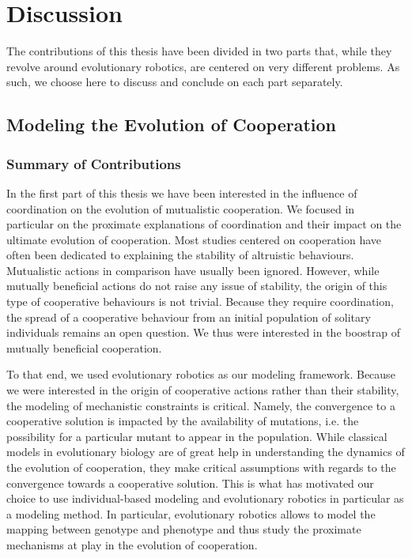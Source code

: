 \chapter{Discussion}


\minitoc[n] %

The contributions of this thesis have been divided in two parts that, while they revolve around evolutionary robotics, are centered on very different problems. As such, we choose here to discuss and conclude on each part separately.

\section{Modeling the Evolution of Cooperation}

	\subsection{Summary of Contributions}

		In the first part of this thesis we have been interested in the influence of coordination on the evolution of mutualistic cooperation. We focused in particular on the proximate explanations of coordination and their impact on the ultimate evolution of cooperation. Most studies centered on cooperation have often been dedicated to explaining the stability of altruistic behaviours. Mutualistic actions in comparison have usually been ignored. However, while mutually beneficial actions do not raise any issue of stability, the origin of this type of cooperative behaviours is not trivial. Because they require coordination, the spread of a cooperative behaviour from an initial population of solitary individuals remains an open question. We thus were interested in the boostrap of mutually beneficial cooperation.

		To that end, we used evolutionary robotics as our modeling framework. Because we were interested in the origin of cooperative actions rather than their stability, the modeling of mechanistic constraints is critical. Namely, the convergence to a cooperative solution is impacted by the availability of mutations, i.e. the possibility for a particular mutant to appear in the population. While classical models in evolutionary biology are of great help in understanding the dynamics of the evolution of cooperation, they make critical assumptions with regards to the convergence towards a cooperative solution. This is what has motivated our choice to use individual-based modeling and evolutionary robotics in particular as a modeling method. In particular, evolutionary robotics allows to model the mapping between genotype and phenotype and thus study the proximate mechanisms at play in the evolution of cooperation.

